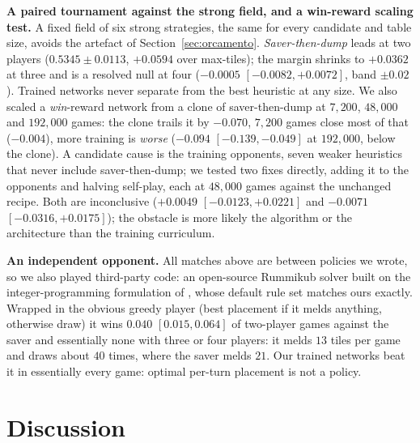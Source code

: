 \documentclass[10pt,journal,compsoc]{IEEEtran}
\begin{document}
\textbf{A paired tournament against the strong field, and a win-reward scaling test.} A fixed field of six strong strategies, the same for every candidate and table size, avoids the artefact of Section~\ref{sec:orcamento}. \emph{Saver-then-dump} leads at two players ($0.5345\pm0.0113$, $+0.0594$ over max-tiles); the margin shrinks to $+0.0362$ at three and is a resolved null at four ($-0.0005$ $[-0.0082,+0.0072]$, band $\pm0.02$). Trained networks never separate from the best heuristic at any size. We also scaled a \emph{win}-reward network from a clone of saver-then-dump at $7{,}200$, $48{,}000$ and $192{,}000$ games: the clone trails it by $-0.070$, $7{,}200$ games close most of that ($-0.004$), more training is \emph{worse} ($-0.094$ $[-0.139,-0.049]$ at $192{,}000$, below the clone). A candidate cause is the training opponents, seven weaker heuristics that never include saver-then-dump; we tested two fixes directly, adding it to the opponents and halving self-play, each at $48{,}000$ games against the unchanged recipe. Both are inconclusive ($+0.0049$ $[-0.0123,+0.0221]$ and $-0.0071$ $[-0.0316,+0.0175]$); the obstacle is more likely the algorithm or the architecture than the training curriculum.

\textbf{An independent opponent.} All matches above are between policies we wrote, so we also played third-party code: an open-source Rummikub solver \cite{rummikubsolver} built on the integer-programming formulation of \cite{denhertog2006}, whose default rule set matches ours exactly. Wrapped in the obvious greedy player (best placement if it melds anything, otherwise draw) it wins $0.040$ $[0.015,0.064]$ of two-player games against the saver and essentially none with three or four players: it melds $13$ tiles per game and draws about $40$ times, where the saver melds $21$. Our trained networks beat it in essentially every game: optimal per-turn placement is not a policy.

\section{Discussion}\label{sec:disc}
\end{document}
